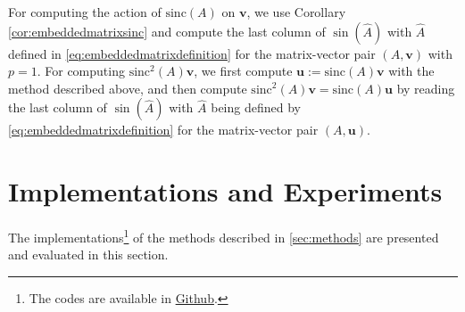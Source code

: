For computing the action of $\mathrm{sinc}(A)$ on $\mathbf{v}$, we use Corollary
\ref{cor:embeddedmatrixsinc} and compute the last column of $\sin(\hat{A})$ with
$\hat{A}$ defined in \eqref{eq:embeddedmatrixdefinition} for the matrix-vector
pair $(A, \mathbf{v})$ with $p=1$. For computing $\mathrm{sinc}^2(A) \mathbf{v}$, we
first compute $\mathbf{u} := \mathrm{sinc}(A)\mathbf{v}$ with the method described above, and then
compute $\mathrm{sinc}^2(A) \mathbf{v} = \mathrm{sinc}(A) \mathbf{u}$ by reading the last column
of $\sin(\hat{A})$ with $\hat{A}$ being defined by
\eqref{eq:embeddedmatrixdefinition} for the matrix-vector pair $(A, \mathbf{u})$.

\FloatBarrier

\section{Implementations and Experiments}
\label{sec:experiments}
The implementations\footnote{The codes are available in \href{https://github.com/sepeehr/KAMF}{Github}.}
of the methods described in \autoref{sec:methods} are presented and evaluated in this section.

